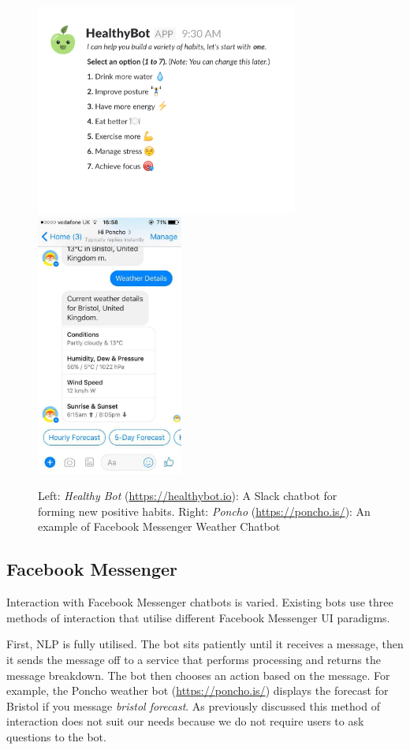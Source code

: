 \begin{figure}[H]
  \centering
  \includegraphics[width=3.4in]{../resources/existing-bots/healthy-bot.png}
  \hspace{10px}
  \includegraphics[width=1.9in]{../resources/existing-bots/poncho.jpg}
  \caption{Left: \textit{Healthy Bot} (\url{https://healthybot.io}): A Slack chatbot for forming new positive habits. Right: \textit{Poncho} (\url{https://poncho.is/}): An example of Facebook Messenger Weather Chatbot}
  \label{fig:healthy_bot_and_poncho}
\end{figure}


\subsection*{Facebook Messenger}
Interaction with Facebook Messenger chatbots is varied. Existing bots use three methods of interaction that utilise different Facebook Messenger UI paradigms.

First, NLP is fully utilised. The bot sits patiently until it receives a message, then it sends the message off to a service that performs processing and returns the message breakdown. The bot then chooses an action based on the message. For example, the Poncho weather bot (\url{https://poncho.is/}) displays the forecast for Bristol if you message \textit{bristol forecast}. As previously discussed this method of interaction does not suit our needs because we do not require users to ask questions to the bot.

